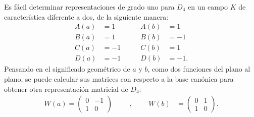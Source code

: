 \begin{ejemplo}[Representación de $D_4$]
Es fácil determinar representaciones de grado uno para $D_4$ en un campo $K$ de característica diferente a dos, de la siguiente manera:
\begin{equation*}
\begin{aligned}
A(a) & = 1\\
B(a) & = 1 \\ 
C(a) & = -1 \\
D(a) & = -1
\end{aligned}
\qquad 
\begin{aligned}
A(b) & = 1\\
B(b) & =  -1 \\
C(b) & = 1 \\
D(b) & = -1.
\end{aligned}
\end{equation*}
Pensando en el significado geométrico de $a$ y $b$, como dos funciones del plano al plano, se puede calcular sus matrices con respecto a la base canónica para obtener otra representación matricial de $D_4$:
\begin{equation*}
\begin{aligned}
W(a) = \begin{pmatrix}
0 & -1 \\
1 & 0
\end{pmatrix}
\end{aligned}
\qquad \text{,} \qquad
\begin{aligned}
W(b) &= \begin{pmatrix}
 0 & 1 \\
 1 & 0
\end{pmatrix}. 
\end{aligned}
\end{equation*}
\end{ejemplo}

